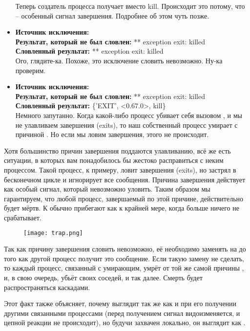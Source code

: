\begin{itemize}
    Теперь создатель процесса получает  вместо {kill}.
    Происходит это потому, что  \--- особенный сигнал завершения.
    Подробнее об этом чуть позже.
\item
    \textbf{Источник исключения:} \\
    \textbf{Результат, который не был словлен:} ** exception exit: killed\\
    \textbf{Словленный результат:} ** exception exit: killed\\
    Ого, глядите\--ка.
    Похоже, это исключение словить невозможно.
    Ну\--ка проверим.
\item
    \textbf{Источник исключения:} \\
    \textbf{Результат, который не был словлен:} ** exception exit: killed\\
    \textbf{Словленный результат:} \{'EXIT', <0.67.0>, kill\}\\
    Немного запутанно.
    Когда какой\--либо процесс убивает себя вызовом , и мы не улавливаем завершения (exits), то наш собственный процесс умирает с причиной .
    Но если мы ловим завершения, этого не происходит.
\end{itemize}

Хотя большинство причин завершения поддаются улавливанию, всё же есть ситуации, в которых вам понадобилось бы жестоко расправиться с неким процессом.
Такой процесс, к примеру,  ловит завершения (exits), но застрял в бесконечном цикле и игнорирует все сообщения.
Причина завершения  действует как особый сигнал, который невозможно уловить.
Таким образом мы гарантируем, что любой процесс, завершаемый по этой причине, действительно будет мёртв.
К  обычно прибегают как к крайней мере, когда больше ничего не срабатывает.
\begin{wrapfigure}{r}{0.4\linewidth}
    \texttt{[image: trap.png]}
\end{wrapfigure}

Так как причину завершения  словить невозможно, её необходимо заменять на  до того как другой процесс получит это сообщение. 
Если такую замену не сделать, то каждый процесс, связанный с умирающим, умрёт от той же самой причины , и, в свою очередь, убьёт своих соседей, и так далее.
Смерть будет распространяться каскадами.

Этот факт также объясняет, почему  выглядит так же как и  при его получении другими связанными процессами (перед получением сигнал видоизменяется, и цепной реакции не происходит), но будучи захвачен локально, он выглядит как .

